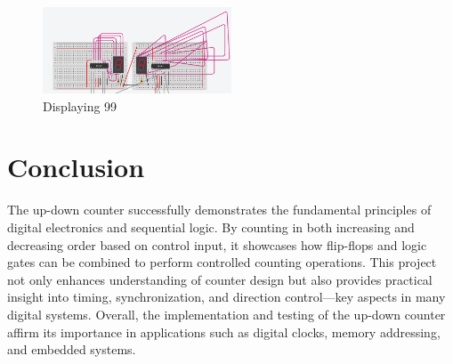 \documentclass[a4paper,12pt]{article}
\begin{document}
\begin{figure}[H]
\centering    
\includegraphics[width=0.5\textwidth]{figs/99.png}
	\caption*{Displaying 99}
\end{figure}

\section{Conclusion}
The up-down counter successfully demonstrates the fundamental principles of digital electronics and sequential logic. By counting in both increasing and decreasing order based on control input, it showcases how flip-flops and logic gates can be combined to perform controlled counting operations. This project not only enhances understanding of counter design but also provides practical insight into timing, synchronization, and direction control—key aspects in many digital systems. Overall, the implementation and testing of the up-down counter affirm its importance in applications such as digital clocks, memory addressing, and embedded systems.
\end{document}
